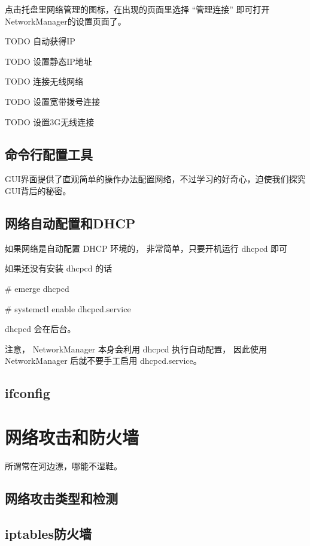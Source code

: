 点击托盘里网络管理的图标，在出现的页面里选择 “管理连接” 即可打开NetworkManager的设置页面了。


TODO 自动获得IP

TODO 设置静态IP地址

TODO 连接无线网络

TODO 设置宽带拨号连接

TODO 设置3G无线连接


\subsection{命令行配置工具}

GUI界面提供了直观简单的操作办法配置网络，不过学习的好奇心，迫使我们探究GUI背后的秘密。

\subsection{网络自动配置和DHCP}\label{sec:DHCP}

如果网络是自动配置 DHCP 环境的， 非常简单，只要开机运行 dhcpcd 即可

\begin{code}
如果还没有安装 dhcpcd 的话

\# emerge dhcpcd
\end{code}

\begin{code}
\# systemctl enable dhcpcd.service
\end{code}

dhcpcd 会在后台。

注意， NetworkManager 本身会利用 dhcpcd 执行自动配置， 因此使用 NetworkManager 后就不要手工启用 dhcpcd.service。

\subsection{ifconfig}



\section{网络攻击和防火墙}

所谓常在河边漂，哪能不湿鞋。

\subsection{网络攻击类型和检测}
\subsection{iptables防火墙}

